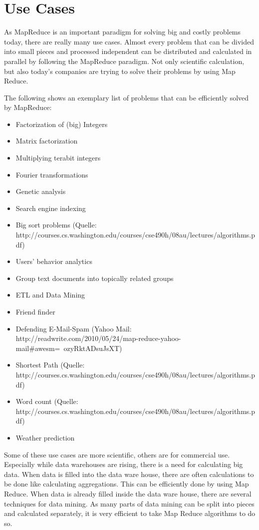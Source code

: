 \chapter{Use Cases}
As MapReduce is an important paradigm for solving big and costly problems today, there are really
many use cases. Almost every problem that can be divided into small pieces and processed independent
can be distributed and calculated in parallel by following the MapReduce paradigm. Not only
scientific calculation, but also today’s companies are trying to solve their problems by using Map
Reduce.

The following shows an exemplary list of problems that can be efficiently solved by MapReduce:
\begin{singlespacing}
	\begin{itemize}
	  \item Factorization of (big) Integers \cite{IntegerFactorization} 
	  \item Matrix factorization \cite{MatrixFactorization} 
	  \item Multiplying terabit integers \cite{TerabitIntegers}
	  \item Fourier transformations
	  \item Genetic analysis \cite{genomeAnalysis} 
	  \item Search engine indexing
	  \item Big sort problems (Quelle: http://courses.cs.washington.edu/courses/cse490h/08au/lectures/algorithms.pdf) 
	  \item Users' behavior analytics
	  \item Group text documents into topically related groups
	  \item ETL and Data Mining
	  \item Friend finder
	  \item Defending E-Mail-Spam (Yahoo Mail: http://readwrite.com/2010/05/24/map-reduce-yahoo-mail#awesm=~ozyRktADsuJsXT) 
	  \item Shortest Path (Quelle: http://courses.cs.washington.edu/courses/cse490h/08au/lectures/algorithms.pdf)  
	  \item Word count (Quelle: http://courses.cs.washington.edu/courses/cse490h/08au/lectures/algorithms.pdf) 
	  \item Weather prediction
	\end{itemize}
\end{singlespacing}
 
Some of these use cases are more scientific, others are for commercial use. Especially while data
warehouses are rising, there is a need for calculating big data. When data is filled into the data
ware house, there are often calculations to be done like calculating aggregations. This can be
efficiently done by using Map Reduce. When data is already filled inside the data ware house, there
are several techniques for data mining. As many parts of data mining can be split into pieces and
calculated separately, it is very efficient to take Map Reduce algorithms to do so.

